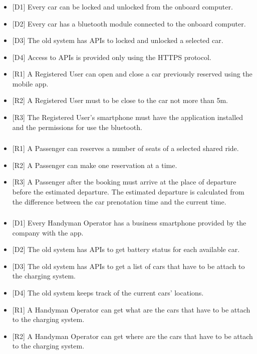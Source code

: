 \subsubsection{\gRegisteredLockUnlock}
\begin{itemize}
	\item {[}D1{]} Every car can be locked and unlocked from the onboard computer.
	\item {[}D2{]} Every car has a bluetooth module connected to the onboard computer.
	\item {[}D3{]} The old system has APIs to locked and unlocked a selected car.
	\item {[}D4{]} Access to APIs is provided only using the HTTPS protocol.
	\item {[}R1{]} A Registered User can open and close a car previously reserved using the mobile app.
	\item {[}R2{]} A Registered User must to be close to the car not more than 5m.
	\item {[}R3{]} The Registered User's smartphone must have the application installed and the permissions for use the bluetooth.
\end{itemize}
\subsubsection{\gPassengerShare}
\begin{itemize}
	\item {[}R1{]} A Passenger can reserves a number of seats of a selected shared ride.
	\item {[}R2{]} A Passenger can make one reservation at a time.
	\item {[}R3{]} A Passenger after the booking must arrive at the place of departure before the estimated departure. The estimated departure is calculated from the difference between the car prenotation time and the current time.
\end{itemize}
\subsubsection{\gHandymanRecharge}
\begin{itemize}
	\item {[}D1{]} Every Handyman Operator has a business smartphone provided by the company with the app.
	\item {[}D2{]} The old system has APIs to get battery status for each available car.
	\item {[}D3{]} The old system has APIs to get a list of cars that have to be attach to the charging system.
	\item {[}D4{]} The old system keeps track of the current cars' locations.
	\item {[}R1{]} A Handyman Operator can get what are the cars that have to be attach to the charging system.
	\item {[}R2{]} A Handyman Operator can get where are the cars that have to be attach to the charging system.
\end{itemize}
